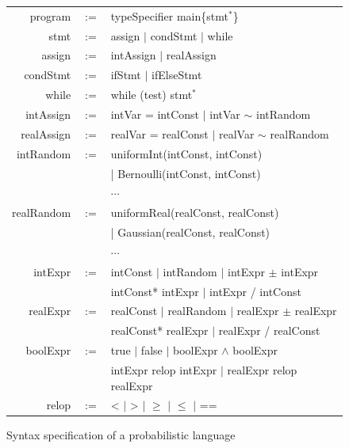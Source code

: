 \documentclass[runningheads]{llncs}
\begin{document}
\begin{figure}[ht]
	\centering
	\begin{tabular}{rcl}
		\hline
		program & $:=$ & typeSpecifier main\{stmt$^*$\} \\
		stmt & $:=$ & assign $\mid$ condStmt $\mid$ while \\
		assign & $:=$ & intAssign $\mid$ realAssign \\
		condStmt & $:=$ & ifStmt $\mid$ ifElseStmt\\
		while & $:=$ & while (test) stmt$^*$\\
		intAssign & $:=$ &  intVar = intConst $\mid$ intVar $\sim$ intRandom\\
		realAssign & $:=$ & realVar = realConst $\mid$ realVar $\sim$ realRandom\\
		intRandom & $:=$ & uniformInt(intConst, intConst)\\
		&  & | Bernoulli(intConst, intConst)\\
		&  & $\cdots$ \\
		realRandom & $:=$ & uniformReal(realConst, realConst)\\
		&  & | Gaussian(realConst, realConst)\\
		&  & $\cdots$ \\
		intExpr & $:=$ & intConst $\mid$ intRandom $\mid$ intExpr $\pm$ intExpr\\
		& & intConst* intExpr $\mid$ intExpr / intConst\\
		realExpr & $:=$ & realConst $\mid$ realRandom $\mid$ realExpr $\pm$ realExpr\\
		& & realConst* realExpr $\mid$ realExpr / realConst\\
		boolExpr& $:=$ & true $\mid$ false $\mid$ boolExpr $\wedge$ boolExpr \\
		& & intExpr relop intExpr $\mid$ realExpr relop realExpr\\
		relop & $:=$ & <  $\mid$  > $\mid$ $\geq$ $\mid$ $\leq$ $\mid$ ==\\
		\hline
	\end{tabular}
	\caption{Syntax specification of a probabilistic language}	\label{syntax}
\end{figure}
\end{document}
